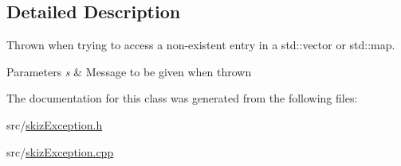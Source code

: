 \subsection{Detailed Description}
Thrown when trying to access a non-\/existent entry in a std\+::vector or std\+::map. 


\begin{DoxyParams}{Parameters}
{\em s} & Message to be given when thrown \\
\hline
\end{DoxyParams}


The documentation for this class was generated from the following files\+:\begin{DoxyCompactItemize}
\item 
src/\mbox{\hyperlink{skizException_8h}{skiz\+Exception.\+h}}\item 
src/\mbox{\hyperlink{skizException_8cpp}{skiz\+Exception.\+cpp}}\end{DoxyCompactItemize}
